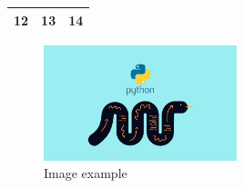 \documentclass{article}
\begin{document}
    \begin{tabular}{|c|c|c|}
        \hline
        12 & 13 & 14 \\
        \hline
    \end{tabular}
    \begin{figure}
        \centering
        \includegraphics[width=0.5\textwidth]{image.jpg}
        \caption{Image example}
        \label{fig:example}
    \end{figure}
\end{document}
